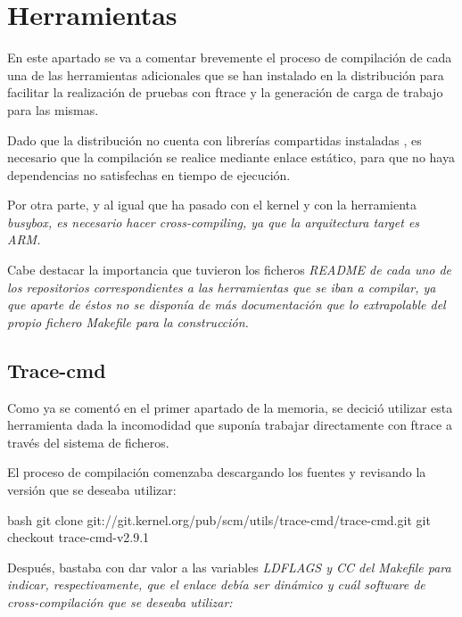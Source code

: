\documentclass[../main.tex]{subfiles}
\begin{document}
\section{Herramientas}

En este apartado se va a comentar brevemente el proceso de compilación de cada una de las herramientas adicionales que se han instalado en la distribución para facilitar la realización de pruebas con ftrace y la generación de carga de trabajo para las mismas.

Dado que la distribución no cuenta con librerías compartidas instaladas , es necesario que la compilación se realice mediante enlace estático, para que no haya dependencias no satisfechas en tiempo de ejecución.

Por otra parte, y al igual que ha pasado con el kernel y con la herramienta \it{busybox}, es necesario hacer cross-compiling, ya que la arquitectura target es \it{ARM}.

Cabe destacar la importancia que tuvieron los ficheros \it{README} de cada uno de los repositorios correspondientes a las herramientas que se iban a compilar, ya que aparte de éstos no se disponía de más documentación que lo extrapolable del propio fichero \it{Makefile} para la construcción.

\subsection{Trace-cmd}

Como ya se comentó en el primer apartado de la memoria, se decició utilizar esta herramienta dada la incomodidad que suponía trabajar directamente con ftrace a través del sistema de ficheros.

El proceso de compilación comenzaba descargando los fuentes y revisando la versión que se deseaba utilizar:
\begin{codigo}{bash}
git clone git://git.kernel.org/pub/scm/utils/trace-cmd/trace-cmd.git
git checkout trace-cmd-v2.9.1
\end{codigo}

Después, bastaba con dar valor a las variables \it{LDFLAGS} y \it{CC} del \it{Makefile} para indicar, respectivamente, que el enlace debía ser dinámico y cuál software de cross-compilación que se deseaba utilizar:
\end{document}
